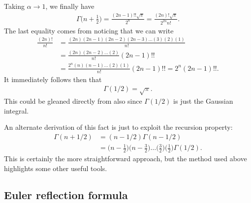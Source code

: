 Taking $\alpha \rightarrow 1$, we finally have
\begin{eqnarray}
    \Gamma\Big( n + \frac{1}{2} \Big) = \frac{(2n -1)!! \sqrt{\pi}}{2^{n}} = \frac{(2n)! \sqrt{\pi}}{2^{2n} n!}
.\end{eqnarray}
The last equality comes from noticing that we can write
\begin{align}
    \frac{(2n)!}{n!} &= \frac{(2n)(2n-1)(2n-2)(2n-3)\ldots(3)(2)(1)}{n!} \nonumber \\
                     &= \frac{(2n)(2n-2)\ldots(2)}{n!} (2n-1)!! \nonumber \\
                     &= \frac{2^{n}(n)(n-1)\ldots(2)(1)}{n!} (2n-1)!! = 2^{n} (2n-1)!!
.\end{align}
It immediately follows then that
\begin{eqnarray}
    \Gamma(1/2) = \sqrt{\pi}
.\end{eqnarray}
This could be gleaned directly from  also since $\Gamma(1/2)$ is just the Gaussian integral.

An alternate derivation of this fact is just to exploit the recursion property:
\begin{align}
    \Gamma(n+1/2) &= (n-1/2)\Gamma(n-1/2) \nonumber \\
                  &= \Big( n - \frac{1}{2} \Big) \Big( n - \frac{3}{2} \Big) \ldots \Big( \frac{3}{2} \Big) \Big( \frac{1}{2} \Big)\Gamma(1/2)
.\end{align}
This is certainly the more straightforward approach, but the method used above highlights some other useful tools.


\subsection{Euler reflection formula}

